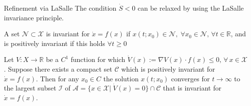 \documentclass[aspectratio=169]{beamer}
\newcommand{\bbR}{\mathbb{R}}
\begin{document}
\begin{frame}{Refinement via LaSalle}
	The condition $\dot{S} <0$ can be relaxed by using the LaSalle invariance principle.
	\begin{definition}
		A set $\mathcal{N} \subset \mathcal{X}$ is invariant for $\dot{x} = f(x)$ if $x(t; x_0) \in \mathcal{N}, 
		\; \forall  x_0 \in \mathcal{N}, \, \forall t \in \bbR$, and is positively invariant if this holds $\forall t\ge 0$
	\end{definition}
	
	\begin{theorem}
		Let $V : X \rightarrow \bbR$ be a $C^1$ function for which $\dot{V}(x) := \nabla V(x) \cdot 
		f(x) \le 0, \, \forall \, x \in \mathcal{X}$. Suppose there exists a compact set $\mathcal{C}$ which is positively invariant for $\dot{x} = f(x)$. Then for any $x_0 \in C$ the solution $x(t; x_0)$ converges
		for $t \rightarrow \infty$ to the largest subset $\mathcal{I}$ of $\mathcal{A} = \{x \in \mathcal{X} | \; \dot{V}(x) = 0\} \cap \mathcal{C}$ that is invariant for $\dot{x} = f(x)$.
	\end{theorem}
	
\end{frame}
\end{document}

